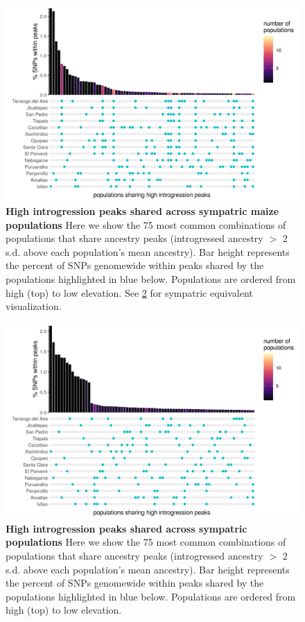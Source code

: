 \begin{figure}[ht]
\includegraphics[width=\textwidth]{chapter2/figures/combmatrix_peak_sharing_maize.png}
\caption{\color{Gray} \textbf{High introgression peaks shared across sympatric maize populations} Here we show the 75 most common combinations of populations that share ancestry peaks (introgressed ancestry $>$ 2 s.d. above each population's mean ancestry). Bar height represents the percent of SNPs genomewide within peaks shared by the populations highlighted in blue below. Populations are ordered from high (top) to low elevation. See \ref{combmatrix_peaks_mexicana} for sympatric \mexicana equivalent visualization.}
\label{combmatrix_peaks_maize}
\end{figure}

\begin{figure}[ht]
\includegraphics[width=\textwidth]{chapter2/figures/combmatrix_peak_sharing_mexicana.png}
\caption{\color{Gray} \textbf{High introgression peaks shared across sympatric \mexicana populations} Here we show the 75 most common combinations of populations that share ancestry peaks (introgressed ancestry $>$ 2 s.d. above each population's mean ancestry). Bar height represents the percent of SNPs genomewide within peaks shared by the populations highlighted in blue below. Populations are ordered from high (top) to low elevation.}
\label{combmatrix_peaks_mexicana}
\end{figure}

